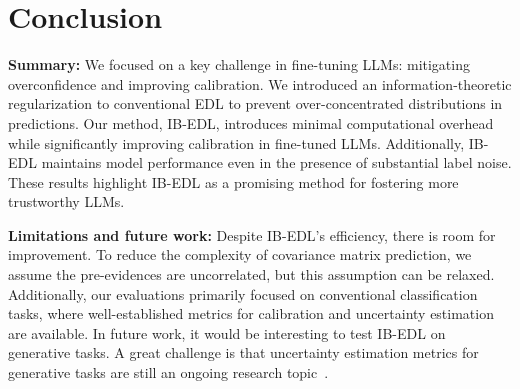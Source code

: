 \section{Conclusion}

\textbf{Summary:} We focused on a key challenge in fine-tuning LLMs: mitigating overconfidence and improving calibration. We introduced an information-theoretic regularization to conventional EDL to prevent over-concentrated distributions in predictions. Our method, IB-EDL, introduces minimal computational overhead while significantly improving calibration in fine-tuned LLMs. Additionally, IB-EDL maintains model performance even in the presence of substantial label noise. These results highlight IB-EDL as a promising method for fostering more trustworthy LLMs.

\textbf{Limitations and future work:} Despite IB-EDL's efficiency, there is room for improvement. To reduce the complexity of covariance matrix prediction, we assume the pre-evidences are uncorrelated, but this assumption can be relaxed. Additionally, our evaluations primarily focused on conventional classification tasks, where well-established metrics for calibration and uncertainty estimation are available. In future work, it would be interesting to test IB-EDL on generative tasks. A great challenge is that uncertainty estimation metrics for generative tasks are still an ongoing research topic~\citep{yadkori2024believe,jesson2024estimating}. 
